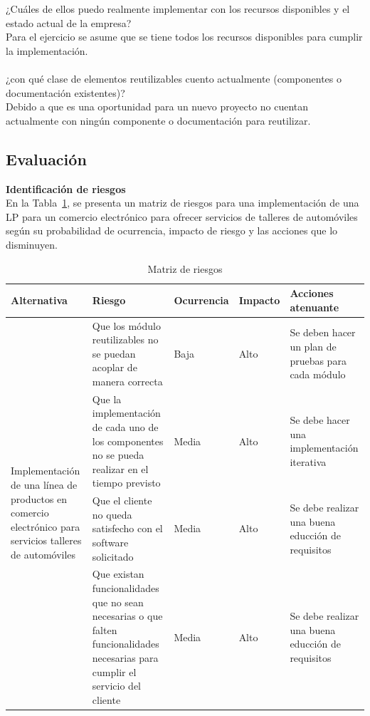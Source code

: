 \documentclass[10pt,a4paper,openany]{book}
\begin{document}
¿Cuáles de ellos puedo realmente implementar con los recursos disponibles y el estado actual de la empresa?\\
Para el ejercicio se asume que se tiene todos los recursos disponibles para cumplir la implementación.\\\\
¿con qué clase de elementos reutilizables cuento actualmente (componentes o documentación existentes)?\\
Debido a que es una oportunidad para un nuevo proyecto no cuentan actualmente con ningún componente o documentación para reutilizar.\\ \cite{url1} \cite{url2}


\subsection{Evaluación}

\textbf{Identificación de riesgos}\\
En la Tabla~\ref{table:t7}, se presenta un matriz de riesgos para una implementación de una LP para un comercio electrónico para ofrecer servicios de talleres de automóviles según su probabilidad de ocurrencia, impacto de riesgo y las acciones que lo disminuyen.

\begin{table}[htbp]
\centering
\begin{tabular}{|p{3cm}|p{4cm}|p{2cm}|p{2cm}|p{4cm}|} \hline
Alternativa & Riesgo & Ocurrencia & Impacto & Acciones atenuante \\ \hline
\multirow{4}{3cm}{Implementación de una línea de productos en comercio electrónico para servicios talleres de automóviles} & Que los módulo reutilizables no se puedan acoplar de manera correcta
 & Baja & Alto & Se deben hacer un plan de pruebas para cada módulo
\\
\cline{2-5} & Que la implementación de cada uno de los componentes no se pueda realizar en el tiempo previsto & Media & Alto & Se debe hacer una implementación iterativa\\ 
\cline{2-5} & Que el cliente no queda satisfecho con el software solicitado
 & Media & Alto & Se debe realizar una buena educción de requisitos\\ 
\cline{2-5} & Que existan funcionalidades que no sean necesarias o que falten funcionalidades necesarias para cumplir el servicio del cliente & Media & Alto & Se debe realizar una buena educción de requisitos\\ \hline
\end{tabular}
\caption{Matriz de riesgos}
\label{table:t7}
\end{table}
\end{document}
